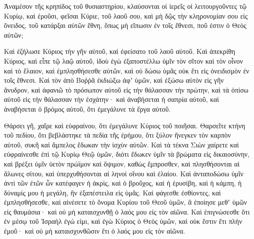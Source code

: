 {Ἀναμέσον τῆς κρηπίδος τοῦ θυσιαστηρίου, κλαύσονται οἱ ἱερεῖς οἱ λειτουργοῦντες τῷ Κυρίῳ, καὶ ἐροῦσι, φεῖσαι Κύριε, τοῦ λαοῦ σου, καὶ μὴ δῷς τὴν κληρονομίαν σου εἰς ὄνειδος, τοῦ κατάρξαι αὐτῶν ἔθνη, ὅπως μὴ εἴπωσιν ἐν τοῖς ἔθνεσι, ποῦ ἐστιν ὁ Θεὸς αὐτῶν;
\par }{\PP {}Καὶ ἐζήλωσε Κύριος τὴν γῆν αὐτοῦ, καὶ ἐφείσατο τοῦ λαοῦ αὐτοῦ.
Καὶ ἀπεκρίθη Κύριος, καὶ εἶπε τῷ λαῷ αὐτοῦ, ἰδοὺ ἐγὼ ἐξαποστέλλω ὑμῖν τὸν σῖτον καὶ τὸν οἶνον καὶ τὸ ἔλαιον, καὶ ἐμπλησθήσεσθε αὐτῶν, καὶ οὐ δώσω ὑμᾶς οὐκ ἔτι εἰς ὀνειδισμὸν ἐν τοῖς ἔθνεσι.
Καὶ τὸν ἀπὸ Βοῤῥᾶ ἐκδιώξω ἀφʼ ὑμῶν, καὶ ἐξώσω αὐτὸν εἰς γῆν ἄνυδρον, καὶ ἀφανιῶ τὸ πρόσωπον αὐτοῦ εἰς τὴν θάλασσαν τὴν πρώτην, καὶ τὰ ὀπίσω αὐτοῦ εἰς τὴν θάλασσαν τὴν ἐσχάτην· καὶ ἀναβήσεται ἡ σαπρία αὐτοῦ, καὶ ἀναβήσεται ὁ βρόμος αὐτοῦ, ὅτι ἐμεγάλυνε τὰ ἔργα αὐτοῦ.
\par }{\PP {}Θάρσει γῆ, χαῖρε καὶ εὐφραίνου, ὅτι ἐμεγάλυνε Κύριος τοῦ ποιῆσαι.
Θαρσεῖτε κτήνη τοῦ πεδίου, ὅτι βεβλάστηκε τὰ πεδία τῆς ἐρήμου, ὅτι ξύλον ἤνεγκεν τὸν καρπὸν αὐτοῦ, συκῆ καὶ ἄμπελος ἔδωκαν τὴν ἰσχὺν αὐτῶν.
Καὶ τὰ τέκνα Σιὼν χαίρετε καὶ εὐφραίνεσθε ἐπὶ τῷ Κυρίῳ Θεῷ ὑμῶν, διότι ἔδωκεν ὑμῖν τὰ βρώματα εἰς δικαιοσύνην, καὶ βρέξει ὑμῖν ὑετὸν πρώϊμον καὶ ὄψιμον, καθὼς ἔμπροσθεν,
καὶ πλησθήσονται αἱ ἅλωνες σίτου, καὶ ὑπερχυθήσονται αἱ ληνοὶ οἴνου καὶ ἐλαίου.
Καὶ ἀνταποδώσω ὑμῖν ἀντὶ τῶν ἐτῶν ὧν κατέφαγεν ἡ ἀκρὶς, καὶ ὁ βροῦχος, καὶ ἡ ἐρυσίβη, καὶ ἡ κάμπη, ἡ δύναμίς μου ἡ μεγάλη, ἣν ἐξαπέστειλα εἰς ὑμᾶς.
Καὶ φάγεσθε ἐσθίοντες, καὶ ἐμπλησθήσεσθε, καὶ αἰνέσετε τὸ ὄνομα Κυρίου τοῦ Θεοῦ ὑμῶν, ἃ ἐποίησε μεθʼ ὑμῶν εἰς θαυμάσια· καὶ οὐ μὴ καταισχυνθῇ ὁ λαός μου εἰς τὸν αἰῶνα.
Καὶ ἐπιγνώσεσθε ὅτι ἐν μέσῳ τοῦ Ἰσραὴλ ἐγώ εἰμι, καὶ ἐγὼ Κύριος ὁ Θεὸς ὑμῶν, καὶ οὐκ ἕστιν ἔτι πλὴν ἐμοῦ· καὶ οὐ μὴ καταισχυνθῶσιν ἔτι ὁ λαός μου εἰς τὸν αἰῶνα.

\par }
